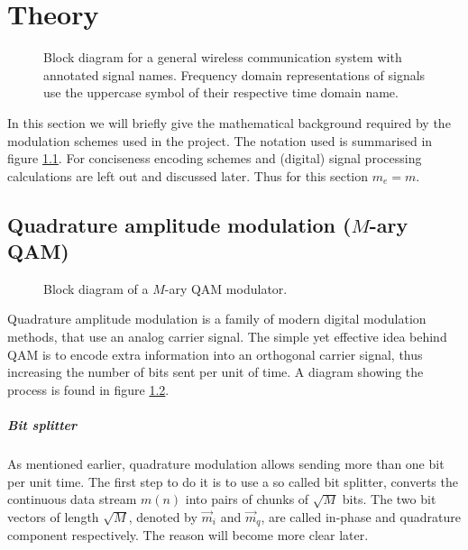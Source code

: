 
\chapter{Theory}

\begin{figure}
	\centering
	
	\caption{
		Block diagram for a general wireless communication system with annotated signal names. Frequency domain representations of signals use the uppercase symbol of their respective time domain name.
		\label{fig:notation}
	}
\end{figure}

In this section we will briefly give the mathematical background required by the modulation schemes used in the project. The notation used is summarised in figure \ref{fig:notation}. For conciseness encoding schemes and (digital) signal processing calculations are left out and discussed later. Thus for this section \(m_e = m\).


\section{Quadrature amplitude modulation (\(M\)-ary QAM)}

\begin{figure}
	\centering
	
	\caption{
		Block diagram of a \(M\)-ary QAM modulator.
		\label{fig:quadrature-modulation}
	}
\end{figure}

Quadrature amplitude modulation is a family of modern digital modulation methods, that use an analog carrier signal. The simple yet effective idea behind QAM is to encode extra information into an orthogonal carrier signal, thus increasing the number of bits sent per unit of time. A diagram showing the process is found in figure \ref{fig:quadrature-modulation}.


\paragraph{Bit splitter}

As mentioned earlier, quadrature modulation allows sending more than one bit per unit time. The first step to do it is to use a so called bit splitter, converts the continuous data stream \(m(n)\) into pairs of chunks of \(\sqrt{M}\) bits. The two bit vectors of length \(\sqrt{M}\), denoted by \(\vec{m}_i\) and \(\vec{m}_q\), are called in-phase and quadrature component respectively. The reason will become more clear later.

